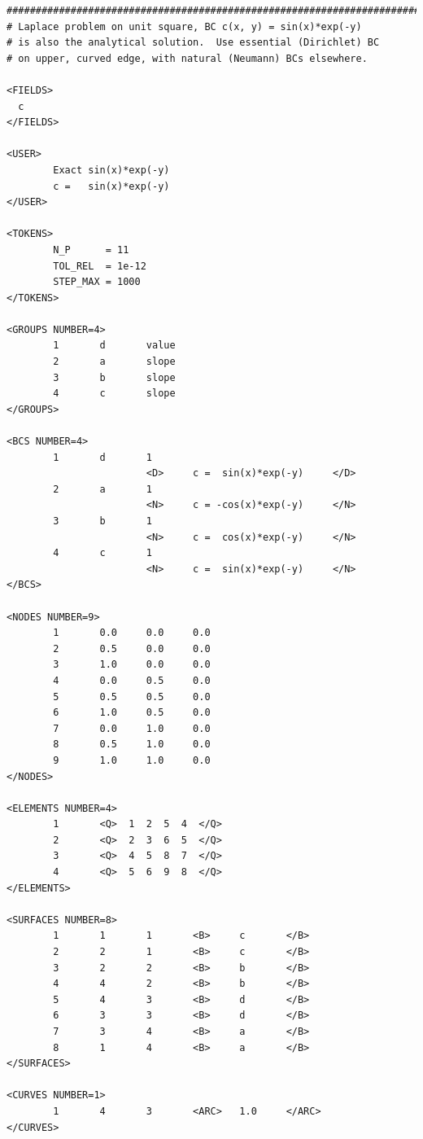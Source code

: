 \documentclass[11pt]{report}
\begin{document}
{\small
\begin{verbatim}
##############################################################################
# Laplace problem on unit square, BC c(x, y) = sin(x)*exp(-y)
# is also the analytical solution.  Use essential (Dirichlet) BC
# on upper, curved edge, with natural (Neumann) BCs elsewhere.

<FIELDS>
  c
</FIELDS>

<USER>  
        Exact sin(x)*exp(-y)
        c =   sin(x)*exp(-y)
</USER>

<TOKENS>
        N_P      = 11
        TOL_REL  = 1e-12
        STEP_MAX = 1000
</TOKENS>

<GROUPS NUMBER=4>
        1       d       value
        2       a       slope
        3       b       slope
        4       c       slope
</GROUPS>

<BCS NUMBER=4>
        1       d       1
                        <D>     c =  sin(x)*exp(-y)     </D>
        2       a       1
                        <N>     c = -cos(x)*exp(-y)     </N>
        3       b       1
                        <N>     c =  cos(x)*exp(-y)     </N>
        4       c       1
                        <N>     c =  sin(x)*exp(-y)     </N>
</BCS>

<NODES NUMBER=9>
        1       0.0     0.0     0.0
        2       0.5     0.0     0.0
        3       1.0     0.0     0.0
        4       0.0     0.5     0.0
        5       0.5     0.5     0.0
        6       1.0     0.5     0.0
        7       0.0     1.0     0.0
        8       0.5     1.0     0.0
        9       1.0     1.0     0.0
</NODES>

<ELEMENTS NUMBER=4>
        1       <Q>  1  2  5  4  </Q>
        2       <Q>  2  3  6  5  </Q>
        3       <Q>  4  5  8  7  </Q>
        4       <Q>  5  6  9  8  </Q>
</ELEMENTS>

<SURFACES NUMBER=8>
        1       1       1       <B>     c       </B>
        2       2       1       <B>     c       </B>
        3       2       2       <B>     b       </B>
        4       4       2       <B>     b       </B>
        5       4       3       <B>     d       </B>
        6       3       3       <B>     d       </B>
        7       3       4       <B>     a       </B>
        8       1       4       <B>     a       </B>
</SURFACES>

<CURVES NUMBER=1>
        1       4       3       <ARC>   1.0     </ARC>
</CURVES>
\end{verbatim}
}
\end{document}
